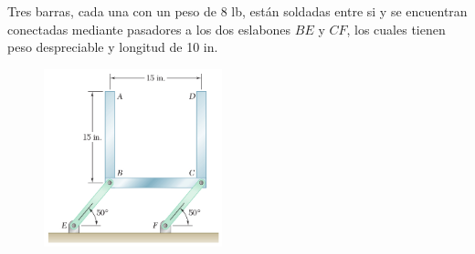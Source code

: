 \documentclass[ a4paper, twoside, 11pt]{article}
\begin{document}
\begin{problem}
Tres barras, cada una con un peso de 8 lb, est\'an soldadas entre si y se encuentran conectadas mediante pasadores a los dos eslabones $BE$ y $CF$, los cuales tienen peso despreciable y longitud de 10 in. 

\begin{figure}[htb]
\centering
\includegraphics[width=0.46\textwidth]{problema-02.jpg}
\end{figure}


\end{problem}
\end{document}
